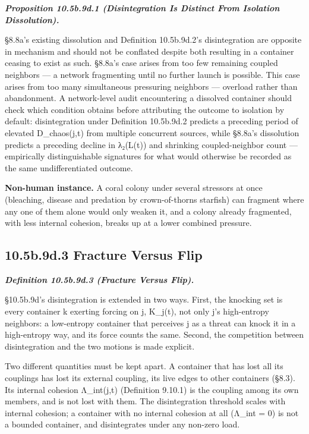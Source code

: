\documentclass[
]{article}
\begin{document}
\emph{\textbf{Proposition 10.5b.9d.1 (Disintegration Is Distinct From
Isolation Dissolution).}}

§8.8a's existing dissolution and Definition 10.5b.9d.2's disintegration
are opposite in mechanism and should not be conflated despite both
resulting in a container ceasing to exist as such. §8.8a's case arises
from too few remaining coupled neighbors --- a network fragmenting until
no further launch is possible. This case arises from too many
simultaneous pressuring neighbors --- overload rather than abandonment.
A network-level audit encountering a dissolved container should check
which condition obtains before attributing the outcome to isolation by
default: disintegration under Definition 10.5b.9d.2 predicts a preceding
period of elevated D\_chaos(j,t) from multiple concurrent sources, while
§8.8a's dissolution predicts a preceding decline in λ₂(L(t)) and
shrinking coupled-neighbor count --- empirically distinguishable
signatures for what would otherwise be recorded as the same
undifferentiated outcome.

\textbf{Non-human instance.} A coral colony under several stressors at
once (bleaching, disease and predation by crown-of-thorns starfish) can
fragment where any one of them alone would only weaken it, and a colony
already fragmented, with less internal cohesion, breaks up at a lower
combined pressure.

\hypertarget{b.9d.3-fracture-versus-flip}{%
\subsection{10.5b.9d.3 Fracture Versus
Flip}\label{b.9d.3-fracture-versus-flip}}

\emph{\textbf{Definition 10.5b.9d.3 (Fracture Versus Flip).}}

§10.5b.9d's disintegration is extended in two ways. First, the knocking
set is every container k exerting forcing on j, K\_j(t), not only j's
high-entropy neighbors: a low-entropy container that perceives j as a
threat can knock it in a high-entropy way, and its force counts the
same. Second, the competition between disintegration and the two motions
is made explicit.

Two different quantities must be kept apart. A container that has lost
all its couplings has lost its external coupling, its live edges to
other containers (§8.3). Its internal cohesion Λ\_int(j,t) (Definition
9.10.1) is the coupling among its own members, and is not lost with
them. The disintegration threshold scales with internal cohesion; a
container with no internal cohesion at all (Λ\_int = 0) is not a bounded
container, and disintegrates under any non-zero load.
\end{document}
